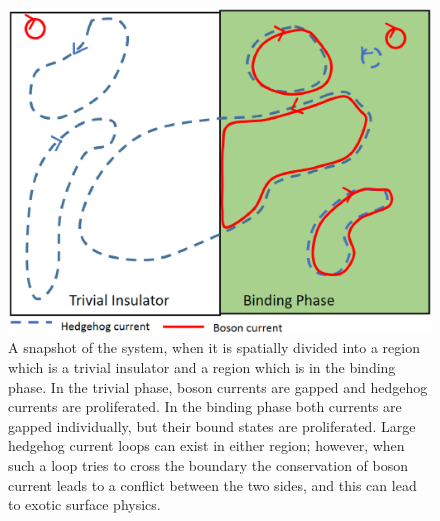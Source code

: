 \begin{figure}
\includegraphics[width=\linewidth]{figures/surface.eps}
\caption{A snapshot of the system, when it is spatially divided into a region which is a trivial insulator and a region which is in the binding phase. In the trivial phase, boson currents are gapped and hedgehog currents are proliferated. In the binding phase both currents are gapped individually, but their bound states are proliferated. Large hedgehog current loops can exist in either region; however, when such a loop tries to cross the boundary the conservation of boson current leads to a conflict between the two sides, and this can lead to exotic surface physics. }
\label{surface}
\end{figure}


